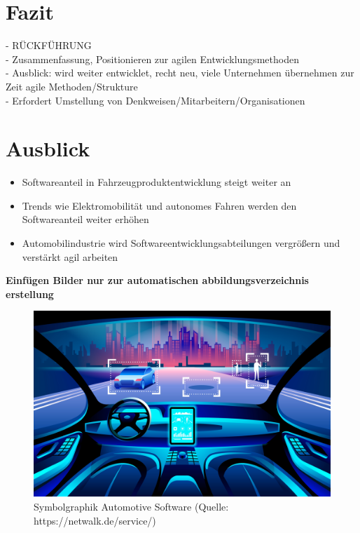  \cite{anjum2020agile}

\section{Fazit}
- RÜCKFÜHRUNG\\
- Zusammenfassung, Positionieren zur agilen Entwicklungsmethoden \\
- Ausblick: wird weiter entwicklet, recht neu, viele Unternehmen übernehmen zur Zeit agile Methoden/Strukture \\
- Erfordert Umstellung von Denkweisen/Mitarbeitern/Organisationen\\

\cite{Porsche2021}

\section{Ausblick}
\begin{itemize}
	\item Softwareanteil in Fahrzeugproduktentwicklung steigt weiter an
	\item Trends wie Elektromobilität und autonomes Fahren werden den Softwareanteil weiter erhöhen
	\item Automobilindustrie wird Softwareentwicklungsabteilungen vergrößern und verstärkt agil arbeiten
\end{itemize}

\newpage
\listoffigures
\textbf{Einfügen Bilder nur zur automatischen abbildungsverzeichnis erstellung}
\begin{figure}[htb]
	\centering
	\includegraphics[width=\textwidth]{img/titelbild.jpg}
	\caption[Symbolgraphik Automotive Software (Quelle: https://netwalk.de/service/)]{Symbolgraphik Automotive Software (Quelle: https://netwalk.de/service/)}
	\label{fig:titelbild}
\end{figure}

